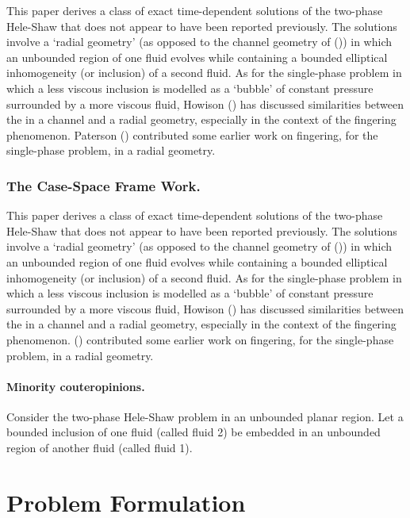 \documentclass[fleqn]{jleo}
\begin{document}
This paper derives a class of exact time-dependent solutions of the two-phase Hele-Shaw  that does not appear to have been reported previously.
The solutions involve a `radial geometry' (as opposed
to the channel geometry of (\citealt{JS})) in which 
an unbounded region of one fluid evolves 
while containing a bounded elliptical inhomogeneity
(or inclusion) of a second fluid.
As for the single-phase problem in which a
less viscous inclusion is modelled as a `bubble' of constant
pressure surrounded by a 
more viscous fluid, Howison (\citealt{How10}) has discussed similarities
between the  in a channel and a radial 
geometry, especially in the context of the fingering
phenomenon. Paterson (\citealt{Pat}) contributed some earlier work
on fingering, for the single-phase problem, in a radial geometry.

\subsubsection{The Case-Space Frame Work.}

This paper derives a class of exact time-\break dependent solutions of the two-phase Hele-Shaw  that does not appear to have been reported previously.
The solutions involve a `radial geometry' (as opposed
to the channel geometry of (\citealt{JS})) in which 
an unbounded region of one fluid evolves 
while containing a bounded elliptical inhomogeneity
(or inclusion) of a second fluid.
As for the single-phase problem in which a
less viscous inclusion is modelled as a `bubble' of constant
pressure surrounded by a 
more viscous fluid, Howison (\citealt{How10}) has discussed similarities
between the  in a channel and a radial 
geometry, especially in the context of the fingering
phenomenon. (\citealt{Pat}) contributed some earlier work
on fingering, for the single-phase problem, in a radial geometry.

\paragraph{Minority couteropinions.}

Consider the two-phase Hele-Shaw problem in an unbounded
planar region. Let a bounded inclusion of one fluid 
(called fluid 2) be embedded in an unbounded region of
another fluid (called fluid 1).

\section{Problem Formulation}
\end{document}
